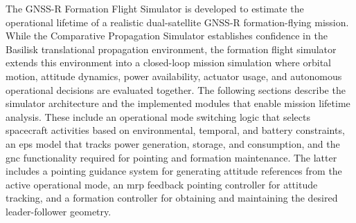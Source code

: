 The GNSS-R Formation Flight Simulator is developed to estimate the operational lifetime of a realistic dual-satellite GNSS-R formation-flying mission. While the Comparative Propagation Simulator establishes confidence in the Basilisk translational propagation environment, the formation flight simulator extends this environment into a closed-loop mission simulation where orbital motion, attitude dynamics, power availability, actuator usage, and autonomous operational decisions are evaluated together. The following sections describe the simulator architecture and the implemented modules that enable mission lifetime analysis. These include an operational mode switching logic that selects spacecraft activities based on environmental, temporal, and battery constraints, an \gls{eps} model that tracks power generation, storage, and consumption, and the \gls{gnc} functionality required for pointing and formation maintenance. The latter includes a pointing guidance system for generating attitude references from the active operational mode, an \gls{mrp} feedback pointing controller for attitude tracking, and a formation controller for obtaining and maintaining the desired leader-follower geometry.

